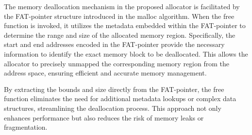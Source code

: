\documentclass[11pt]{article}
\begin{document}
The memory deallocation mechanism in the proposed allocator is facilitated by the FAT-pointer structure 
introduced in the malloc algorithm. When the free function is invoked, it utilizes the metadata 
embedded within the FAT-pointer to determine the range and size of the allocated memory region. 
Specifically, the start and end addresses encoded in the FAT-pointer provide the necessary information 
to identify the exact memory block to be deallocated. This allows the allocator to precisely unmapped 
the corresponding memory region from the address space, ensuring efficient and accurate memory management.

By extracting the bounds and size directly from the FAT-pointer, the free function eliminates the need 
for additional metadata lookups or complex data structures, streamlining the deallocation process. 
This approach not only enhances performance but also reduces the risk of memory leaks or fragmentation.



\end{document}
